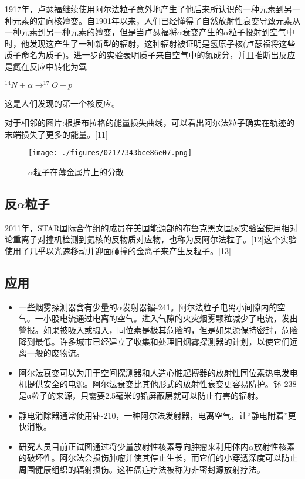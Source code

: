 1917年，卢瑟福继续使用阿尔法粒子意外地产生了他后来所认识的一种元素到另一种元素的定向核嬗变。自1901年以来，人们已经懂得了自然放射性衰变导致元素从一种元素到另一种元素的嬗变，但是当卢瑟福将$\alpha$衰变产生的$\alpha$粒子投射到空气中时，他发现这产生了一种新型的辐射，这种辐射被证明是氢原子核(卢瑟福将这些质子命名为质子)。进一步的实验表明质子来自空气中的氮成分，并且推断出反应是氮在反应中转化为氧

$^{14}N + \alpha \to ^{17}O + p$

这是人们发现的第一个核反应。

对于相邻的图片:根据布拉格的能量损失曲线，可以看出阿尔法粒子确实在轨迹的末端损失了更多的能量。[11]
\begin{figure}[ht]
\centering
\texttt{[image: ./figures/02177343bce86e07.png]}
\caption{$\alpha$粒子在薄金属片上的分散} \label{fig_ALZ_5}
\end{figure}

\subsection{反$\alpha$粒子}
2011年，STAR国际合作组的成员在美国能源部的布鲁克黑文国家实验室使用相对论重离子对撞机检测到氦核的反物质对应物，也称为反阿尔法粒子。[12]这个实验使用了几乎以光速移动并迎面碰撞的金离子来产生反粒子。[13]

\subsection{应用}
\begin{itemize}
\item 一些烟雾探测器含有少量的$\alpha$发射器镅-241。阿尔法粒子电离小间隙内的空气。一小股电流通过电离的空气。进入气隙的火灾烟雾颗粒减少了电流，发出警报。如果被吸入或摄入，同位素是极其危险的，但是如果源保持密封，危险降到最低。许多城市已经建立了收集和处理旧烟雾探测器的计划，以使它们远离一般的废物流。
\item 阿尔法衰变可以为用于空间探测器和人造心脏起搏器的放射性同位素热电发电机提供安全的电源。阿尔法衰变比其他形式的放射性衰变更容易防护。钚-238是α粒子的来源，只需要2.5毫米的铅屏蔽层就可以防止有害的辐射。
\item 静电消除器通常使用钋-210，一种阿尔法发射器，电离空气，让“静电附着”更快消散。
\item 研究人员目前正试图通过将少量放射性核素导向肿瘤来利用体内$\alpha$放射性核素的破坏性。阿尔法会损伤肿瘤并使其停止生长，而它们的小穿透深度可以防止周围健康组织的辐射损伤。这种癌症疗法被称为非密封源放射疗法。
\end{itemize}


